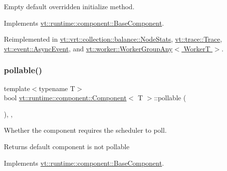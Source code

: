 Empty default overridden initialize method. 



Implements \hyperlink{structvt_1_1runtime_1_1component_1_1_base_component_ae361291ee8a37325580e59fb4030bc3a}{vt\+::runtime\+::component\+::\+Base\+Component}.



Reimplemented in \hyperlink{structvt_1_1vrt_1_1collection_1_1balance_1_1_node_stats_a0c60d1566daa6465f56b09e27058d6a1}{vt\+::vrt\+::collection\+::balance\+::\+Node\+Stats}, \hyperlink{structvt_1_1trace_1_1_trace_a24019edd964c0a307008f8d6a0f1f825}{vt\+::trace\+::\+Trace}, \hyperlink{structvt_1_1event_1_1_async_event_ac8d9f977b1cca3f43a06d0e83bc88e3d}{vt\+::event\+::\+Async\+Event}, and \hyperlink{structvt_1_1worker_1_1_worker_group_any_ad8bb855b98bf26337ca13df2bff5fb95}{vt\+::worker\+::\+Worker\+Group\+Any$<$ Worker\+T $>$}.

\mbox{\label{structvt_1_1runtime_1_1component_1_1_component_a5a15bd0369a9d3765a6c70249bada96f}} 
\subsubsection{\texorpdfstring{pollable()}{pollable()}}
{\footnotesize\ttfamily template$<$typename T$>$ \\
bool \hyperlink{structvt_1_1runtime_1_1component_1_1_component}{vt\+::runtime\+::component\+::\+Component}$<$ T $>$\+::pollable (\begin{DoxyParamCaption}{ }\end{DoxyParamCaption})\hspace{0.3cm}{\ttfamily [inline]}, {\ttfamily [override]}, {\ttfamily [virtual]}}



Whether the component requires the scheduler to poll. 

\begin{DoxyReturn}{Returns}
default component is not pollable 
\end{DoxyReturn}


Implements \hyperlink{structvt_1_1runtime_1_1component_1_1_base_component_ab651a49e6d4d3d8ca9e82a6b4b10af66}{vt\+::runtime\+::component\+::\+Base\+Component}.



